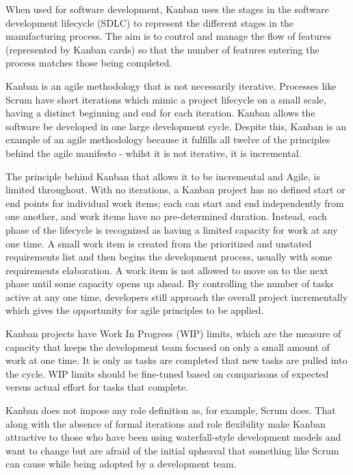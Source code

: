 \begin{spacing}{1.2}
When used for software development, Kanban uses the stages in the software development lifecycle (SDLC) to represent the different stages in the manufacturing process. The aim is to control and manage the flow of features (represented by Kanban cards) so that the number of features entering the process matches those being completed.
\newline

Kanban is an agile methodology that is not necessarily iterative. Processes like Scrum have short iterations which mimic a project lifecycle on a small scale, having a distinct beginning and end for each iteration. Kanban allows the software be developed in one large development cycle. Despite this, Kanban is an example of an agile methodology because it fulfills all twelve of the principles behind the agile manifesto -  whilst it is not iterative, it is incremental.
\newline

The principle behind Kanban that allows it to be incremental and Agile, is limited throughout. With no iterations, a Kanban project has no defined start or end points for individual work items; each can start and end independently from one another, and work items have no pre-determined duration. Instead, each phase of the lifecycle is recognized as having a limited capacity for work at any one time. A small work item is created from the prioritized and unstated requirements list and then begins the development process, usually with some requirements elaboration. A work item is not allowed to move on to the next phase until some capacity opens up ahead. By controlling the number of tasks active at any one time, developers still approach the overall project incrementally which gives the opportunity for agile principles to be applied.
\newline

Kanban projects have Work In Progress (WIP) limits, which are the measure of capacity that keeps the development team focused on only a small amount of work at one time. It is only as tasks are completed that new tasks are pulled into the cycle. WIP limits should be fine-tuned based on comparisons of expected versus actual effort for tasks that complete.
\newline

Kanban does not impose any role definition as, for example, Scrum does. That along with the absence of formal iterations and role flexibility make Kanban attractive to those who have been using waterfall-style development models and want to change but are afraid of the initial upheaval that something like Scrum can cause while being adopted by a development team.


\end{spacing}
